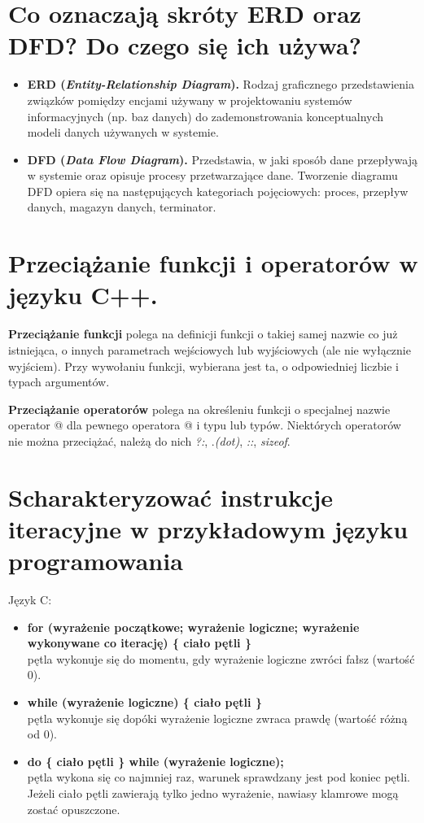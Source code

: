 \documentclass[12pt,a4paper]{article}
\begin{document}
	\section{Co oznaczają skróty ERD oraz DFD? Do czego się ich używa?}
	\begin{itemize}
		\item \textbf{ERD (\textit{Entity-Relationship Diagram}).} Rodzaj graficznego przedstawienia związków pomiędzy encjami używany w projektowaniu systemów informacyjnych (np. baz danych) do zademonstrowania konceptualnych modeli danych używanych w systemie.
		\item \textbf{DFD (\textit{Data Flow Diagram}).} Przedstawia, w jaki sposób dane przepływają w systemie oraz opisuje procesy przetwarzające dane. Tworzenie diagramu DFD opiera się na następujących kategoriach pojęciowych: proces, przepływ danych, magazyn danych, terminator.
	\end{itemize}

	\section{Przeciążanie funkcji i operatorów w języku C++.}
	\label{sec:przecfuncpp}
	\textbf{Przeciążanie funkcji }polega na definicji funkcji o takiej samej nazwie co już istniejąca, o innych parametrach wejściowych lub wyjściowych (ale nie wyłącznie wyjściem). Przy wywołaniu funkcji, wybierana jest ta, o odpowiedniej liczbie i typach argumentów.
	
    \textbf{Przeciążanie operatorów} polega na określeniu funkcji o specjalnej nazwie operator @ dla pewnego operatora @ i typu lub typów. Niektórych operatorów nie można przeciążać, należą do nich \textit{?:}, .\textit{(dot)}, \textit{::}, \textit{sizeof}.

	\section{Scharakteryzować instrukcje iteracyjne w przykładowym języku programowania}
	Język C:
	\begin{itemize}
		\item \textbf{for (wyrażenie początkowe; wyrażenie logiczne; wyrażenie wykonywane co iterację) \{ ciało pętli \}}\\
		pętla wykonuje się do momentu, gdy wyrażenie logiczne zwróci fałsz (wartość 0).
	
		\item \textbf{while (wyrażenie logiczne) \{ ciało pętli \}}\\	
		pętla wykonuje się dopóki wyrażenie logiczne zwraca prawdę (wartość różną od 0).
		
		\item \textbf{do \{ ciało pętli \} while (wyrażenie logiczne);}\\
		pętla wykona się co najmniej raz, warunek sprawdzany jest pod koniec pętli. Jeżeli ciało pętli zawierają tylko jedno wyrażenie, nawiasy klamrowe mogą zostać opuszczone.
	\end{itemize}
\end{document}
